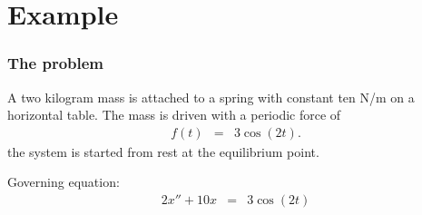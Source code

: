 \documentclass{beamer}
\begin{document}
\section{Example}

\begin{frame}                   
  \frametitle{The problem}      
                                
  A two kilogram mass is attached to a spring with constant ten N/m on
  a horizontal table. The mass is driven with a periodic force of
  \begin{eqnarray*}
    f(t) & = & 3 \cos(2t).
  \end{eqnarray*}
  the system is started from rest at the equilibrium point.

  Governing equation:
  \begin{eqnarray*}
    2 x'' + 10 x & = & 3 \cos(2t)
  \end{eqnarray*}

\end{frame}
\end{document}
